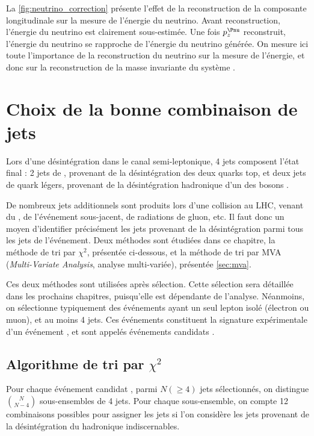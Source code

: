 \medskip

La \cref{fig:neutrino_correction} présente l'effet de la reconstruction de la composante longitudinale sur la mesure de l'énergie du neutrino. Avant reconstruction, l'énergie du neutrino est clairement sous-estimée. Une fois $p_z^{\Pnu}$ reconstruit, l'énergie du neutrino se rapproche de l'énergie du neutrino générée. On mesure ici toute l'importance de la reconstruction du neutrino sur la mesure de l'énergie, et donc sur la reconstruction de la masse invariante du système \ttbar.

\section{Choix de la bonne combinaison de jets} \label{sec:chi2}

Lors d'une désintégration \ttbar dans le canal semi-leptonique, 4 jets composent l'état final : 2 jets de \Pbottom, provenant de la désintégration des deux quarks top, et deux jets de quark légers, provenant de la désintégration hadronique d'un des bosons \PW.

De nombreux jets additionnels sont produits lors d'une collision au LHC, venant du \pu, de l'événement sous-jacent, de radiations de gluon, etc. Il faut donc un moyen d'identifier précisément les jets provenant de la désintégration \ttbar parmi tous les jets de l'événement. Deux méthodes sont étudiées dans ce chapitre, la méthode de tri par $\chi^2$, présentée ci-dessous, et la méthode de tri par MVA (\emph{Multi-Variate Analysis}, analyse multi-variée), présentée \cref{sec:mva}.

\medskip

Ces deux méthodes sont utilisées après sélection. Cette sélection sera détaillée dans les prochains chapitres, puisqu'elle est dépendante de l'analyse. Néanmoins, on sélectionne typiquement des événements ayant un seul lepton isolé (électron ou muon), et au moins 4 jets. Ces événements constituent la signature expérimentale d'un événement \ttbar, et sont appelés événements candidats \ttbar.

\subsection{Algorithme de tri par \texorpdfstring{$\chi^2$}{chi²}}

Pour chaque événement candidat \ttbar, parmi $N (\geq 4)$ jets sélectionnés, on distingue $\binom{N}{N - 4}$ sous-ensembles de 4 jets. Pour chaque sous-ensemble, on compte 12 combinaisons possibles pour assigner les jets si l'on considère les jets provenant de la désintégration du \PW hadronique indiscernables.


